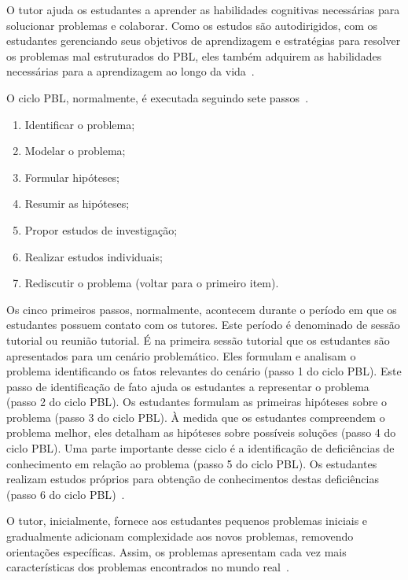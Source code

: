 O tutor ajuda os estudantes a aprender as habilidades cognitivas
necessárias para solucionar problemas e colaborar.
Como os estudos são autodirigidos, com os estudantes gerenciando
seus objetivos de aprendizagem e estratégias
para resolver os problemas mal estruturados do \ac{PBL}, eles
também adquirem as habilidades necessárias para a
aprendizagem ao longo da vida~\cite{hmelo2004problem}.


O ciclo \ac{PBL}, normalmente, é executada seguindo sete
passos~\cite{de2014aprendizado,conrado2014aprendizagem}.

\begin{enumerate}
\item{Identificar o problema;}
\item{Modelar o problema;}
\item{Formular hipóteses;}
\item{Resumir as hipóteses;}
\item{Propor estudos de investigação;}
\item{Realizar estudos individuais;}
\item{Rediscutir o problema (voltar para o primeiro item).}
\end{enumerate}

Os cinco primeiros passos, normalmente, acontecem durante o período
em que os estudantes possuem contato com os tutores.
Este período é
denominado de sessão tutorial ou reunião tutorial.
É na primeira sessão tutorial que os estudantes
são apresentados para um cenário problemático.
Eles formulam e analisam o problema identificando os fatos
relevantes do cenário (passo 1 do ciclo \ac{PBL}).
Este passo de identificação de fato ajuda os estudantes
a representar o problema (passo 2 do ciclo \ac{PBL}).
Os estudantes formulam as primeiras hipóteses sobre o
problema (passo 3 do ciclo \ac{PBL}).
À medida que os estudantes compreendem o problema melhor, eles detalham
as hipóteses sobre possíveis soluções (passo 4 do ciclo \ac{PBL}).
Uma parte importante desse ciclo é a identificação de deficiências
de conhecimento em relação ao problema (passo 5 do ciclo \ac{PBL}).
Os estudantes realizam estudos próprios para obtenção de
conhecimentos destas deficiências
(passo 6 do ciclo \ac{PBL})~\cite{hmelo2004problem}.

O tutor, inicialmente, fornece aos estudantes
pequenos problemas iniciais e gradualmente adicionam
complexidade aos novos problemas, removendo orientações
específicas.
Assim, os problemas apresentam cada vez mais
características dos problemas encontrados no mundo
real~\cite{fee2010teaching}.

